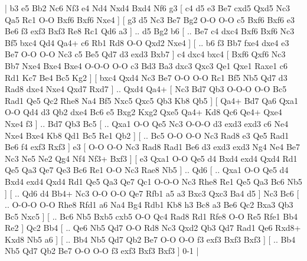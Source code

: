 \makegametitle 
|   b3   e5    Bb2   Nc6    Nf3   e4    Nd4   Nxd4    Bxd4   Nf6    g3 [  c4 d5  e3 Be7  cxd5 Qxd5  Nc3 Qa5  Rc1 O-O  Bxf6 Bxf6  Nxe4   ]  [  g3 d5  Nc3 Be7  Bg2 O-O  O-O c5  Bxf6 Bxf6  e3 Be6  f3 exf3  Bxf3 Re8  Rc1 Qd6  a3   ] .. d5    Bg2   b6 [ .. Be7  c4 dxc4  Bxf6 Bxf6  Nc3 Bf5  bxc4 Qd4  Qa4+ c6  Rb1 Rd8  O-O Qxd2  Nxe4   ]  [ .. b6  f3 Bb7  fxe4 dxe4  e3 Be7  O-O O-O  Nc3 c5  Be5 Qd7  d3 exd3  Bxb7   ]  c4   dxc4    bxc4 [  Bxf6 Qxf6  Nc3 Bb7  Nxe4 Bxe4  Bxe4 O-O-O  O-O c3  Bd3 Ba3  dxc3 Qxc3  Qe1 Qxe1  Raxe1 c6  Rd1 Kc7  Be4 Bc5  Kg2   ]  [  bxc4 Qxd4  Nc3 Be7  O-O O-O  Rc1 Bf5  Nb5 Qd7  d3 Rad8  dxe4 Nxe4  Qxd7 Rxd7   ] .. Qxd4    Qa4+ [  Nc3 Bd7  Qb3 O-O-O  O-O Bc5  Rad1 Qe5  Qc2 Rhe8  Na4 Bf5  Nxc5 Qxc5  Qb3 Kb8  Qb5   ]  [  Qa4+ Bd7  Qa6 Qxa1  O-O Qd4  d3 Qb2  dxe4 Bc6  e5 Bxg2  Kxg2 Qxe5  Qa4+ Kd8  Qc6 Qe4+  Qxe4 Nxe4  f3   ] .. Bd7    Qb3   Bc5 [ .. Qxa1  O-O Qe5  Nc3 O-O-O  d3 exd3  exd3 c6  Ne4 Nxe4  Bxe4 Kb8  Qd1 Bc5  Re1 Qb2   ]  [ .. Bc5  O-O O-O  Nc3 Rad8  e3 Qe5  Rad1 Be6  f4 exf3  Rxf3   ]  e3 [  O-O O-O  Nc3 Rad8  Rad1 Be6  d3 exd3  exd3 Ng4  Ne4 Be7  Nc3 Ne5  Ne2 Qg4  Nf4 Nf3+  Bxf3   ]  [  e3 Qxa1  O-O Qe5  d4 Bxd4  exd4 Qxd4  Rd1 Qe5  Qa3 Qe7  Qe3 Bc6  Re1 O-O  Nc3 Rae8  Nb5   ] .. Qd6 [ .. Qxa1  O-O Qe5  d4 Bxd4  exd4 Qxd4  Rd1 Qe5  Qa3 Qe7  Qc1 O-O-O  Nc3 Rhe8  Re1 Qe5  Qa3 Bc6  Nb5   ]  [ .. Qd6  d4 Bb4+  Nc3 O-O  O-O Qe7  Rfb1 a5  a3 Bxc3  Qxc3 Ba4  d5   ]  Nc3   Bc6 [ .. O-O-O  O-O Rhe8  Rfd1 a6  Na4 Bg4  Rdb1 Kb8  h3 Bc8  a3 Be6  Qc2 Bxa3  Qb3 Bc5  Nxc5   ]  [ .. Bc6  Nb5 Bxb5  cxb5 O-O  Qc4 Rad8  Rd1 Rfe8  O-O Re5  Rfe1 Bb4  Re2   ]  Qc2   Bb4 [ .. Qe6  Nb5 Qd7  O-O Rd8  Nc3 Qxd2  Qb3 Qd7  Rad1 Qe6  Rxd8+ Kxd8  Nb5 a6   ]  [ .. Bb4  Nb5 Qd7  Qb2 Be7  O-O O-O  f3 exf3  Bxf3 Bxf3   ]  [ .. Bb4  Nb5 Qd7  Qb2 Be7  O-O O-O  f3 exf3  Bxf3 Bxf3   ] 0-1  |
